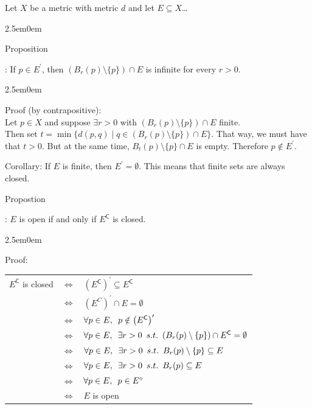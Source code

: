 \documentclass{book}
\newcommand{\hTwo}{%
   \color{MidnightBlue}%
   \fontsize{13}{15}\selectfont%
}
\newcommand{\hThree}{%
   \color{PineGreen}
   \fontsize{13}{15}\selectfont%
}
\newenvironment{myIndent}{%
   \begin{adjustwidth}{2.5em}{0em}%
}{%
   \end{adjustwidth}%
}
\newcommand{\retTwo}{\hfill\bigbreak}
\newcommand{\suchthat}{ \hspace{0.5em}s.t.\hspace{0.5em}}
\newcommand{\comp}{\mathsf{C}}
\newcounter{PropNumber}
\newcommand{\propCount}[1][1]{%
   \addtocounter{PropNumber}{#1}%
   \thePropNumber%
}
\begin{document}
   Let $X$ be a metric with metric $d$ and let $E \subseteq X$\dots \retTwo
   {\begin{myIndent} \hTwo
      Proposition \propCount: If $p \in E^\prime$, then $(B_r(p) \setminus \{p\}) \cap E$ is infinite for every $r > 0$.
      
      {\begin{myIndent} \hThree
         Proof (by contrapositive):\\
         Let $p \in X$ and suppose $\exists r > 0$ with $(B_r(p) \setminus \{p\}) \cap E$ finite.\\ Then set $t = \min{\{d(p, q) \mid q \in (B_r(p) \setminus \{p\}) \cap E\}}$. That way, we must have that $t>0$.
         But at the same time, $B_t(p) \setminus \{p\} \cap E$ is empty. Therefore $p \notin E^\prime$. \retTwo
      \end{myIndent}}

      Corollary: If $E$ is finite, then $E^\prime = \emptyset$. This means that finite sets are always closed. \retTwo

      Propostion \propCount: $E$ is open if and only if $E^\comp$ is closed.

      {\begin{myIndent} \hThree
         Proof:\\
         \begin{tabular}{ r c l }
            $E^\comp$ is closed & $\Longleftrightarrow$ & $\left(E^\comp\right)^\prime \subseteq E^\comp$ \\
            & $\Longleftrightarrow$ & $\left(E^C\right)^\prime \cap E = \emptyset$ \\
            & $\Longleftrightarrow$ & $\forall p \in E, \hspace{0.5em} p \notin \left(E^\comp\right)^\prime$ \\
            & $\Longleftrightarrow$ & $\forall p \in E, \hspace{0.5em} \exists r > 0 \suchthat (B_r(p) \setminus \{p\}) \cap E^\comp = \emptyset$ \\
            & $\Longleftrightarrow$ & $\forall p \in E, \hspace{0.5em} \exists r > 0 \suchthat B_r(p) \setminus \{p\} \subseteq E$ \\
            & $\Longleftrightarrow$ & $\forall p \in E, \hspace{0.5em} \exists r > 0 \suchthat B_r(p) \subseteq E$ \\
            & $\Longleftrightarrow$ & $\forall p \in E, \hspace{0.5em} p \in E^\circ$\\
            & $\Longleftrightarrow$ & $E$ is open\\
         \end{tabular} \retTwo
      \end{myIndent}}


\end{myIndent}}
\end{document}
